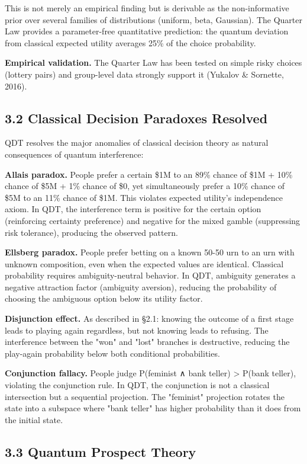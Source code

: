 \documentclass[11pt]{article}
\begin{document}
This is not merely an empirical finding but is derivable as the non-informative
prior over several families of distributions (uniform, beta, Gaussian). The
Quarter Law provides a parameter-free quantitative prediction: the quantum
deviation from classical expected utility averages 25\% of the choice probability.

\textbf{Empirical validation.} The Quarter Law has been tested on simple risky choices
(lottery pairs) and group-level data strongly support it (Yukalov \& Sornette, 2016).
\subsection{3.2 Classical Decision Paradoxes Resolved}
\label{sec:org0278a82}

QDT resolves the major anomalies of classical decision theory as natural
consequences of quantum interference:

\textbf{Allais paradox.} People prefer a certain \$1M to an 89\% chance of \$1M + 10\%
chance of \$5M + 1\% chance of \$0, yet simultaneously prefer a 10\% chance of \$5M
to an 11\% chance of \$1M. This violates expected utility's independence axiom.
In QDT, the interference term is positive for the certain option (reinforcing
certainty preference) and negative for the mixed gamble (suppressing risk
tolerance), producing the observed pattern.

\textbf{Ellsberg paradox.} People prefer betting on a known 50-50 urn to an urn with
unknown composition, even when the expected values are identical. Classical
probability requires ambiguity-neutral behavior. In QDT, ambiguity generates
a negative attraction factor (ambiguity aversion), reducing the probability
of choosing the ambiguous option below its utility factor.

\textbf{Disjunction effect.} As described in §2.1: knowing the outcome of a first stage
leads to playing again regardless, but not knowing leads to refusing. The
interference between the "won" and "lost" branches is destructive,
reducing the play-again probability below both conditional probabilities.

\textbf{Conjunction fallacy.} People judge P(feminist ∧ bank teller) > P(bank teller),
violating the conjunction rule. In QDT, the conjunction is not a classical
intersection but a sequential projection. The "feminist" projection rotates
the state into a subspace where "bank teller" has higher probability than
it does from the initial state.
\subsection{3.3 Quantum Prospect Theory}
\label{sec:org6e88037}
\end{document}
